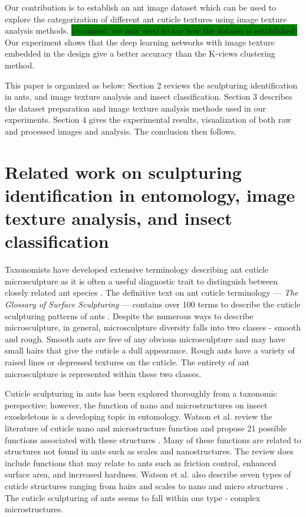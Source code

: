 \documentclass{aci}
\numberwithin{equation}{section}
\begin{document}
Our contribution is to establish an ant image dataset which can be used to
explore the categorization of different ant cuticle textures using image texture
analysis methods. \colorbox{green}{(comment: we may need to say how the dataset
    is established)} Our experiment shows that the deep learning networks with image
texture embedded in the design give a better accuracy than the K-views
clustering method.

This paper is organized as below:  Section 2 reviews the sculpturing
identification in ants, and image texture analysis and insect classification.
Section 3 describes the dataset preparation and image texture analysis methods
used in our experiments. Section 4 gives the experimental results, visualization
of both raw and processed images and analysis. The conclusion then follows.

\section{Related work on sculpturing identification in entomology, image texture
  analysis, and insect classification}


Taxonomists have developed extensive terminology describing ant cuticle
microsculpture as it is often a useful diagnostic trait to distinguish between
closely related ant species \cite{blaimer_taxonomy_2019,fisher_ants_2007}. The
definitive text on ant cuticle terminology — \textit{The Glossary of Surface
    Sculpturing} — contains over 100 terms to describe the cuticle sculpturing
patterns of ants \cite{harris_glossary_1979}. Despite the numerous ways to
describe microsculpture, in general, microsculpture diversity falls into two
classes - smooth and rough. Smooth ants are free of any obvious microsculpture
and may have small hairs that give the cuticle a dull appearance. Rough ants
have a variety of raised lines or depressed textures on the cuticle. The
entirety of ant microsculpture is represented within these two classes.

Cuticle sculpturing in ants has been explored thoroughly from a taxonomic
perspective; however, the function of nano and microstructures on insect
exoskeletons is a developing topic in entomology. Watson et al. review the
literature of cuticle nano and microstructure function and propose 21 possible
functions associated with these structures \cite{watson_diversity_2017}. Many of
these functions are related to structures not found in ants such as scales and
nanostructures. The review does include functions that may relate to ants such
as friction control, enhanced surface area, and increased hardness. Watson et
al. also describe seven types of cuticle structures ranging from hairs and
scales to nano and micro structures \cite{watson_diversity_2017}. The cuticle
sculpturing of ants seems to fall within one type - complex microstructures.
\end{document}
